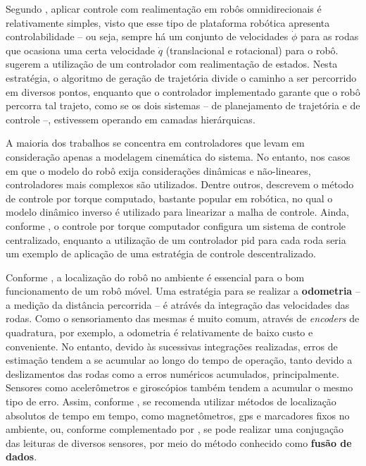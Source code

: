 Segundo \citet{lynch2017modern}, aplicar controle com realimentação em robôs omnidirecionais é relativamente simples, visto que esse tipo de plataforma robótica apresenta controlabilidade -- ou seja, sempre há um conjunto de velocidades \textbf{$\dot\phi$} para as rodas que ocasiona uma certa velocidade \textbf{$\dot{q}$} (translacional e rotacional) para o robô. \citet{siegwart2011introduction} sugerem a utilização de um controlador com realimentação de estados. Nesta estratégia, o algoritmo de geração de trajetória divide o caminho a ser percorrido em diversos pontos, enquanto que o controlador implementado garante que o robô percorra tal trajeto, como se os dois sistemas -- de planejamento de trajetória e de controle --, estivessem operando em camadas hierárquicas.

A maioria dos trabalhos se concentra em controladores que levam em consideração apenas a modelagem cinemática do sistema. No entanto, nos casos em que o modelo do robô exija considerações dinâmicas e não-lineares, controladores mais complexos são utilizados. Dentre outros, \citet{siciliano2016springer} descrevem o método de controle por torque computado, bastante popular em robótica, no qual o modelo dinâmico inverso é utilizado para linearizar a malha de controle. Ainda, conforme \citet{indiveri2009swedish}, o controle por torque computador configura um sistema de controle centralizado, enquanto a utilização de um controlador \acrshort{pid} para cada roda seria um exemplo de aplicação de uma estratégia de controle descentralizado.

Conforme \citet{lynch2017modern}, a localização do robô no ambiente é essencial para o bom funcionamento de um robô móvel. Uma estratégia para se realizar a \textbf{odometria} -- a medição da distância percorrida -- é atrávés da integração das velocidades das rodas. Como o sensoriamento das mesmas é muito comum, através de \textit{encoders} de quadratura, por exemplo, a odometria é relativamente de baixo custo e conveniente. No entanto, devido às sucessivas integrações realizadas, erros de estimação tendem a se acumular ao longo do tempo de operação, tanto devido a deslizamentos das rodas como a erros numéricos acumulados, principalmente. Sensores como acelerômetros e giroscópios também tendem a acumular o mesmo tipo de erro. Assim, conforme \citet{siegwart2011introduction}, se recomenda utilizar métodos de localização absolutos de tempo em tempo, como magnetômetros, \acrshort{gps} e marcadores fixos no ambiente, ou, conforme complementado por \citet{lynch2017modern}, se pode realizar uma conjugação das leituras de diversos sensores, por meio do método conhecido como \textbf{fusão de dados}.

